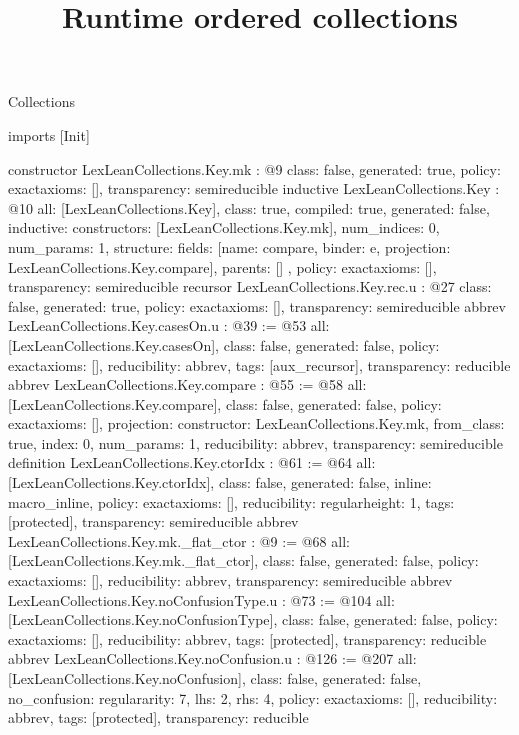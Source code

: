\begin{lexlean}{Collections}
\title{Runtime ordered collections}
\begin{coremodule}
imports [Init]

constructor LexLeanCollections.Key.mk : @9 {
  class: false,
  generated: true,
  policy: exact{axioms: []},
  transparency: semireducible
}
inductive LexLeanCollections.Key : @10 {
  all: [LexLeanCollections.Key],
  class: true,
  compiled: true,
  generated: false,
  inductive: {
    constructors: [LexLeanCollections.Key.mk],
    num_indices: 0,
    num_params: 1,
    structure: {
      fields: [{name: compare, binder: e, projection: LexLeanCollections.Key.compare}],
      parents: []
    }
  },
  policy: exact{axioms: []},
  transparency: semireducible
}
recursor LexLeanCollections.Key.rec.{u} : @27 {
  class: false,
  generated: true,
  policy: exact{axioms: []},
  transparency: semireducible
}
abbrev LexLeanCollections.Key.casesOn.{u} : @39 := @53 {
  all: [LexLeanCollections.Key.casesOn],
  class: false,
  generated: false,
  policy: exact{axioms: []},
  reducibility: abbrev{},
  tags: [aux_recursor],
  transparency: reducible
}
abbrev LexLeanCollections.Key.compare : @55 := @58 {
  all: [LexLeanCollections.Key.compare],
  class: false,
  generated: false,
  policy: exact{axioms: []},
  projection: {constructor: LexLeanCollections.Key.mk, from_class: true, index: 0, num_params: 1},
  reducibility: abbrev{},
  transparency: semireducible
}
definition LexLeanCollections.Key.ctorIdx : @61 := @64 {
  all: [LexLeanCollections.Key.ctorIdx],
  class: false,
  generated: false,
  inline: macro_inline,
  policy: exact{axioms: []},
  reducibility: regular{height: 1},
  tags: [protected],
  transparency: semireducible
}
abbrev LexLeanCollections.Key.mk._flat_ctor : @9 := @68 {
  all: [LexLeanCollections.Key.mk._flat_ctor],
  class: false,
  generated: false,
  policy: exact{axioms: []},
  reducibility: abbrev{},
  transparency: semireducible
}
abbrev LexLeanCollections.Key.noConfusionType.{u} : @73 := @104 {
  all: [LexLeanCollections.Key.noConfusionType],
  class: false,
  generated: false,
  policy: exact{axioms: []},
  reducibility: abbrev{},
  tags: [protected],
  transparency: reducible
}
abbrev LexLeanCollections.Key.noConfusion.{u} : @126 := @207 {
  all: [LexLeanCollections.Key.noConfusion],
  class: false,
  generated: false,
  no_confusion: regular{arity: 7, lhs: 2, rhs: 4},
  policy: exact{axioms: []},
  reducibility: abbrev{},
  tags: [protected],
  transparency: reducible
}
\end{coremodule}
\end{lexlean}
